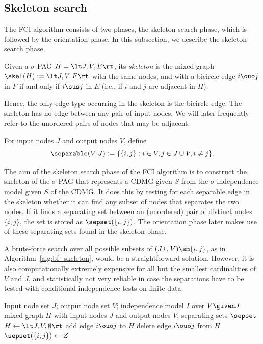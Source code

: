 \subsection{Skeleton search}

The FCI algorithm consists of two phases, the skeleton search phase, which is followed by the orientation phase.
In this subsection, we describe the skeleton search phase.

\begin{Def}\label{def:skeleton}
Given a $\sigma$-PAG $H = \lt J, V, E \rt$, its \emph{skeleton} is the mixed graph 
$\skel(H) := \lt J, V, F \rt$ with the same nodes, and with a bicircle edge $i \ouo j$ in $F$
if and only if $i \sus j$ in $E$ (i.e., if $i$ and $j$ are adjacent in $H$).
\end{Def}
Hence, the only edge type occurring in the skeleton is the bicircle edge.
The skeleton has no edge between any pair of input nodes.
We will later frequently refer to the unordered pairs of nodes that may be adjacent:
\begin{Def}
  For input nodes $J$ and output nodes $V$, define 
  $$\separable(V|J) :=  \{ \{i,j\} : i \in V, j \in J \cup V, i \ne j \}.$$
\end{Def}

The aim of the skeleton search phase of the FCI algorithm is to construct the skeleton of the $\sigma$-PAG that represents a CDMG given $S$ from the $\sigma$-independence model given $S$ of the CDMG.
It does this by testing for each separable edge in the skeleton whether it can find any subset of nodes that separates the two nodes.
If it finds a separating set between an (unordered) pair of distinct nodes $\{i, j\}$, the set is stored as $\sepset(\{i,j\})$.
The orientation phase later makes use of these separating sets found in the skeleton phase.

A brute-force search over all possible subsets of $(J \cup V)\sm \{i,j\}$, as in Algorithm~\ref{alg:bf_skeleton}, would be a straightforward solution.
However, it is also computationally extremely expensive for all but the smallest cardinalities of $V$ and $J$, and statistically not very reliable in case the separations have to be tested with conditional independence tests on finite data.
\begin{algorithm}
  \begin{algorithmic}[1]
    \Input Input node set $J$; output node set $V$; independence model $I$ over $V \given J$
    \Output mixed graph $H$ with input nodes $J$ and output nodes $V$; separating sets $\sepset$
    \State $H \leftarrow \lt J, V, \emptyset \rt$
      \State add edge $i \ouo j$ to $H$
        \State delete edge $i \ouo j$ from $H$
        \State $\sepset(\{i,j\}) \leftarrow Z$
        \Break
      \EndIf
      \EndFor
    \EndFor
  \end{algorithmic}
  \caption{Brute-force skeleton algorithm.\label{alg:bf_skeleton}}
\end{algorithm}

